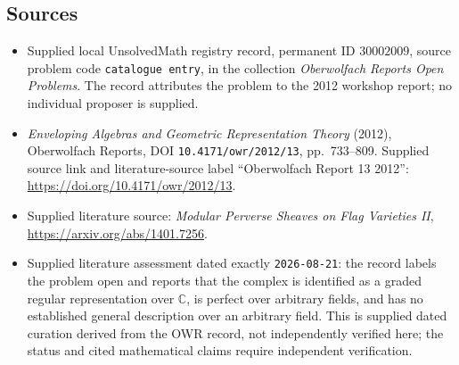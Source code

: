 \documentclass[11pt]{article}
\newcommand{\C}{\mathbb{C}}
\begin{document}
\subsection{Sources}
\begin{itemize}
\item Supplied local UnsolvedMath registry record, permanent ID \(30002009\), source problem code \texttt{catalogue entry}, in the collection \emph{Oberwolfach Reports Open Problems}. The record attributes the problem to the 2012 workshop report; no individual proposer is supplied.
\item \emph{Enveloping Algebras and Geometric Representation Theory} (2012), Oberwolfach Reports, DOI \texttt{10.4171/owr/2012/13}, pp.~733--809. Supplied source link and literature-source label ``Oberwolfach Report 13 2012'': \url{https://doi.org/10.4171/owr/2012/13}.
\item Supplied literature source: \emph{Modular Perverse Sheaves on Flag Varieties II}, \url{https://arxiv.org/abs/1401.7256}.
\item Supplied literature assessment dated exactly \texttt{2026-08-21}: the record labels the problem open and reports that the complex is identified as a graded regular representation over \(\C\), is perfect over arbitrary fields, and has no established general description over an arbitrary field. This is supplied dated curation derived from the OWR record, not independently verified here; the status and cited mathematical claims require independent verification.
\end{itemize}
\end{document}

